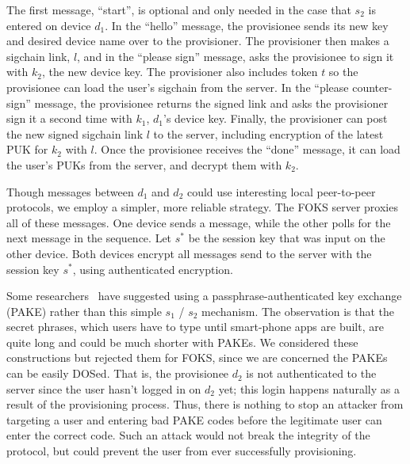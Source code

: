 \begin{center}
\end{center}

The first message, ``start'', is optional and only needed in the case that $s_2$
is entered on device $d_1$. In the ``hello'' message, the provisionee sends its
new key and desired device name over to the provisioner. The provisioner then
makes a sigchain link, $l$, and in the ``please sign'' message, asks the
provisionee to sign it with $k_2$, the new device key. The provisioner also
includes token $t$ so the provisionee can load the user's sigchain from the
server. In the ``please counter-sign'' message, the provisionee returns the
signed link and asks the provisioner sign it a second time with $k_1$, $d_1$'s
device key. Finally, the provisioner can post the new signed sigchain link $l$
to the server, including encryption of the latest PUK for $k_2$ with $l$. Once
the provisionee receives the ``done'' message, it can load the user's PUKs from
the server, and decrypt them with $k_2$.

Though messages between $d_1$ and $d_2$ could use interesting local peer-to-peer
protocols, we employ a simpler, more reliable strategy. The FOKS server proxies
all of these messages. One device sends a message, while the other polls for the
next message in the sequence. Let $s^{*}$ be the session key that was input on
the other device. Both devices encrypt all messages send to the server with the
session key $s^{*}$, using authenticated encryption.

Some researchers~\cite{ncc2019} have suggested using a passphrase-authenticated
key exchange (PAKE) rather than this simple $s_1$ / $s_2$ mechanism. The
observation is that the secret phrases, which users have to type until
smart-phone apps are built, are quite long and could be much shorter with PAKEs.
We considered these constructions but rejected them for FOKS, since we are
concerned the PAKEs can be easily DOSed. That is, the provisionee $d_2$ is not
authenticated to the server since the user hasn't logged in on $d_2$ yet; this
login happens naturally as a result of the provisioning process. Thus, there is
nothing to stop an attacker from targeting a user and entering bad PAKE codes
before the legitimate user can enter the correct code. Such an attack would not
break the integrity of the protocol, but could prevent the user from ever
successfully provisioning.


